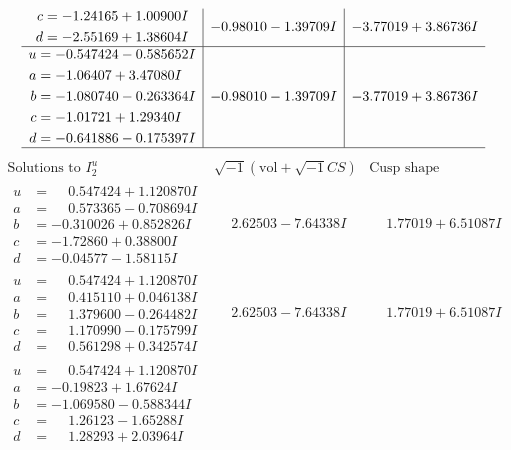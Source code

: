 \documentclass[1p]{elsarticle_modified}
\theoremstyle{definition}
\newcommand{\I}{\sqrt{-1}}
\begin{document}
$$\begin{array}{c|c|c}
\begin{aligned}
c &= -1.24165 + 1.00900 I \\
d &= -2.55169 + 1.38604 I\end{aligned}
 & -0.98010 - 1.39709 I & -3.77019 + 3.86736 I \\ \hline\begin{aligned}
u &= -0.547424 - 0.585652 I \\
a &= -1.06407 + 3.47080 I \\
b &= -1.080740 - 0.263364 I \\
c &= -1.01721 + 1.29340 I \\
d &= -0.641886 - 0.175397 I\end{aligned}
 & -0.98010 - 1.39709 I & -3.77019 + 3.86736 I\\
 \hline 
 \end{array}$$\newpage$$\begin{array}{c|c|c}  
\text{Solutions to }I^u_{2}& \I (\text{vol} + \sqrt{-1}CS) & \text{Cusp shape}\\
 \hline 
\begin{aligned}
u &= \phantom{-}0.547424 + 1.120870 I \\
a &= \phantom{-}0.573365 - 0.708694 I \\
b &= -0.310026 + 0.852826 I \\
c &= -1.72860 + 0.38800 I \\
d &= -0.04577 - 1.58115 I\end{aligned}
 & \phantom{-}2.62503 - 7.64338 I & \phantom{-}1.77019 + 6.51087 I \\ \hline\begin{aligned}
u &= \phantom{-}0.547424 + 1.120870 I \\
a &= \phantom{-}0.415110 + 0.046138 I \\
b &= \phantom{-}1.379600 - 0.264482 I \\
c &= \phantom{-}1.170990 - 0.175799 I \\
d &= \phantom{-}0.561298 + 0.342574 I\end{aligned}
 & \phantom{-}2.62503 - 7.64338 I & \phantom{-}1.77019 + 6.51087 I \\ \hline\begin{aligned}
u &= \phantom{-}0.547424 + 1.120870 I \\
a &= -0.19823 + 1.67624 I \\
b &= -1.069580 - 0.588344 I \\
c &= \phantom{-}1.26123 - 1.65288 I \\
d &= \phantom{-}1.28293 + 2.03964 I\end{aligned}

\end{array}$$
\end{document}
